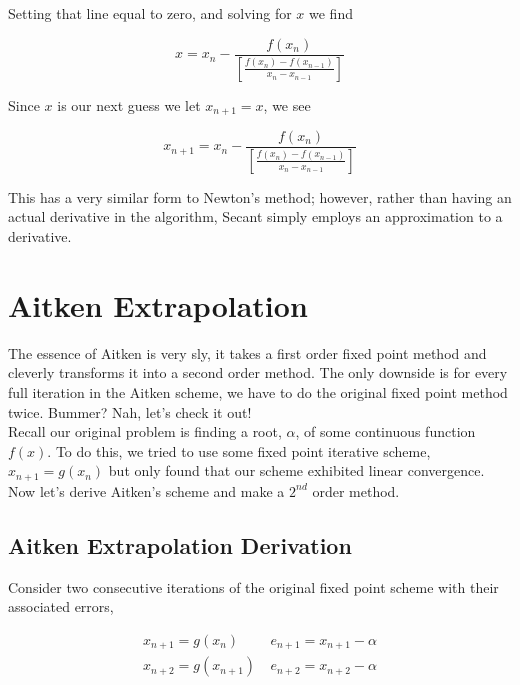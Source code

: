 \documentclass[paper=a4, fontsize=11pt]{scrartcl} %
\numberwithin{equation}{section} %
\numberwithin{figure}{section} %
\numberwithin{table}{section} %
\begin{document}
Setting that line equal to zero, and solving for $x$ we find

$$x = x_n - \frac{ f(x_n) }{  \left[\frac{f(x_n) - f(x_{n-1})}{x_n - x_{n-1}}\right]  }$$

Since $x$ is our next guess we let $x_{n+1} = x$, we see

$$x_{n+1} = x_n - \frac{ f(x_n) }{  \left[\frac{f(x_n) - f(x_{n-1})}{x_n - x_{n-1}}\right]  }$$

This has a very similar form to Newton's method; however, rather than having an actual derivative in the algorithm, Secant simply employs an approximation to a derivative.











%
%

\section{Aitken Extrapolation}

The essence of Aitken is very sly, it takes a first order fixed point method and cleverly transforms it into a second order method. The only downside is for every full iteration in the Aitken scheme, we have to do the original fixed point method twice. Bummer? Nah, let's check it out! \\

Recall our original problem is finding a root, $\alpha$, of some continuous function $f(x)$. To do this, we tried to use some fixed point iterative scheme, $x_{n+1} = g(x_n)$ but only found that our scheme exhibited linear convergence. Now let's derive Aitken's scheme and make a $2^{nd}$ order method. \\

\subsection{Aitken Extrapolation Derivation}

Consider two consecutive iterations of the original fixed point scheme with their associated errors,

$$\begin{array}{cc}
x_{n+1}=g(x_n) & \ e_{n+1}=x_{n+1}-\alpha \\
x_{n+2}=g(x_{n+1}) & \ e_{n+2}=x_{n+2}-\alpha \\
\end{array}$$
\end{document}

